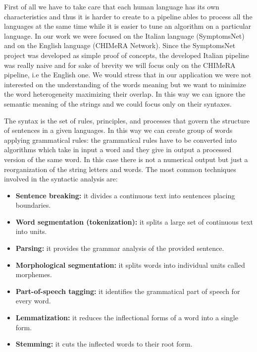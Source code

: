 \documentclass{standalone}
\begin{document}
First of all we have to take care that each human language has its own characteristics and thus it is harder to create to a pipeline ables to process all the languages at the same time while it is easier to tune an algorithm on a particular language.
In our work we were focused on the Italian language (\textsf{SymptomsNet}) and on the English language (\textsf{CHIMeRA} Network).
Since the \textsf{SymptomsNet} project was developed as simple proof of concepts, the developed Italian pipeline was really naive and for sake of brevity we will focus only on the \textsf{CHIMeRA} pipeline, i.e the English one.
We would stress that in our application we were not interested on the understanding of the words meaning but we want to minimize the word heterogeneity maximizing their overlap.
In this way we can ignore the semantic meaning of the strings and we could focus only on their syntaxes.

The syntax is the set of rules, principles, and processes that govern the structure of sentences in a given languages.
In this way we can create group of words applying grammatical rules: the grammatical rules have to be converted into algorithms which take in input a word and they give in output a processed version of the same word.
In this case there is not a numerical output but just a reorganization of the string letters and words.
The most common techniques involved in the syntactic analysis are:

\begin{itemize}

  \item \textbf{Sentence breaking:} it divides a continuous text into sentences placing boundaries.
  \item \textbf{Word segmentation (tokenization):} it splits a large set of continuous text into units.
  \item \textbf{Parsing:} it provides the grammar analysis of the provided sentence.
  \item \textbf{Morphological segmentation:} it splits words into individual units called morphemes.
  \item \textbf{Part-of-speech tagging:} it identifies the grammatical part of speech for every word.
  \item \textbf{Lemmatization:} it reduces the inflectional forms of a word into a single form.
  \item \textbf{Stemming:} it cuts the inflected words to their root form.

\end{itemize}
\end{document}
